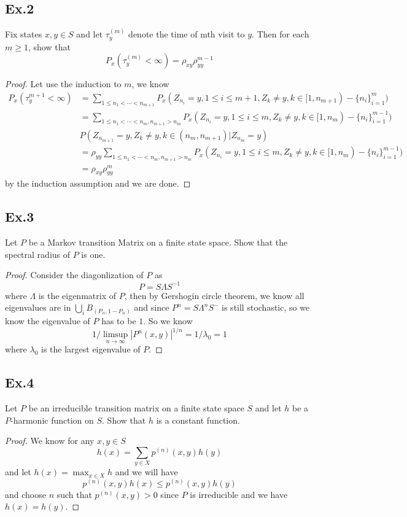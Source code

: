 \documentclass[lang=en,11pt,a4paper,citestyle =authoryear]{elegantpaper}
\begin{document}
\subsection*{Ex.2} 
Fix states $x,y \in S$ and let $\tau_y^{(m)}$ denote the time of mth visit to $y$. Then for each $m\geq 1$, show that
\[P_x(\tau_y^{(m)} < \infty) = \rho_{xy}\rho_{yy}^{m-1}\]
\begin{proof}
   Let use the induction to $m$, we know
   \[
   \begin{aligned}
    P_x(\tau_y^{m+1} < \infty) &= \sum\limits_{1\leq n_1 < \cdots < n_{m+1}} P_x(Z_{n_i} = y, 1\leq i \leq m+1, Z_k \neq y, k\in [1,n_{m+1})-\{n_i\}_{i=1}^m)\\
    &= \sum\limits_{1\leq n_1 < \cdots < n_{m}, n_{m+1}>n_{m}} P_x(Z_{n_i} = y, 1\leq i \leq m, Z_k \neq y, k\in [1,n_{m})-\{n_i\}_{i=1}^{m-1})\\ &P(Z_{n_{m+1}} = y,Z_k \neq y, k \in (n_m,n_{m+1})|Z_{n_m} = y)\\
    &= \rho_{yy}\sum\limits_{1\leq n_1 < \cdots < n_{m}, n_{m+1}>n_{m}} P_x(Z_{n_i} = y, 1\leq i \leq m, Z_k \neq y, k\in [1,n_{m})-\{n_i\}_{i=1}^{m-1})\\
    &= \rho_{xy}\rho^m_{yy}
   \end{aligned}
   \]
    by the induction assumption and we are done.
\end{proof}

\subsection*{Ex.3}
Let $P$ be a Markov transition Matrix on a finite state space. Show that the spectral radius of $P$ is one.
\begin{proof}
    Consider the diagonlization of $P$ as
    \[
    P = S\Lambda S^{-1}
    \]
    where $\Lambda$ is the eigenmatrix of $P$, then by Gershogin circle theorem, we know all eigenvalues are in $\bigcup_{i}B_(P_{ii}, 1-P_{ii})$ and since $P^n = S\Lambda^n S^{-}$ is still stochastic, so we know the eigenvalue of $P$ has to be $1$. So we know
    \[
    1/\limsup_{n\to\infty}|P^n(x,y)|^{1/n} = 1/\lambda_0 = 1
    \]
    where $\lambda_0$ is the largest eigenvalue of $P$.
\end{proof}

\subsection*{Ex.4} 
Let $P$ be an irreducible transition matrix on a finite state space $S$ and let $h$ be a $P$-harmonic function on $S$. Show that $h$ is a constant function.
\begin{proof}
    We know for any $x,y\in S$
    \[
    h(x) = \sum\limits_{y\in X}p^{(n)}(x,y)h(y)
    \]
    and let $h(x) = \max_{x\in X} h$ and we will have
    \[
    p^{(n)}(x,y)h(x) \leq p^{(n)}(x,y)h(y)
    \]
    and choose $n$ such that $p^{(n)}(x,y) > 0$ since $P$ is irreducible and we have $h(x) = h(y)$.
\end{proof}
\end{document}
